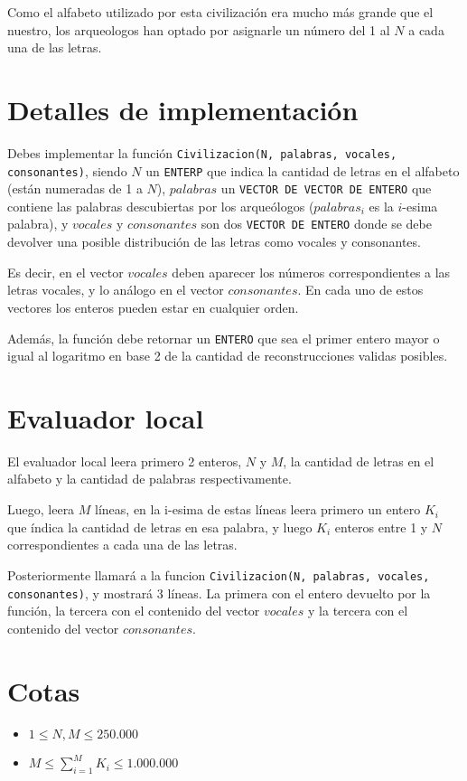 \documentclass[fontsize=13pt, paper=a4, DIV=calc]{scrartcl}
\begin{document}
\begin{multicols*}{2}
Como el alfabeto utilizado por esta civilización era mucho más grande que el nuestro, los arqueologos han optado por asignarle un número del 1 al $N$ a cada una de las letras.

\section{Detalles de implementación}
Debes implementar la función \texttt{Civilizacion(N, palabras, vocales, consonantes)}, siendo $N$ un \texttt{ENTERP} que indica la cantidad de letras en el alfabeto (están numeradas de 1 a $N$), $palabras$ un \texttt{VECTOR DE VECTOR DE ENTERO} que contiene las palabras descubiertas por los arqueólogos ($palabras_i$ es la $i$-esima palabra), y $vocales$ y $consonantes$ son dos \texttt{VECTOR DE ENTERO} donde se debe devolver una posible distribución de las letras como vocales y consonantes.

Es decir, en el vector $vocales$ deben aparecer los números correspondientes a las letras vocales, y lo análogo en el vector $consonantes$. En cada uno de estos vectores los enteros pueden estar en cualquier orden. 

Además, la función debe retornar un \texttt{ENTERO} que sea el primer entero mayor o igual al logaritmo en base 2 de la cantidad de reconstrucciones validas posibles.


\section{Evaluador local}
El evaluador local leera primero 2 enteros, $N$ y $M$, la cantidad de letras en el alfabeto y la cantidad de palabras respectivamente.

Luego, leera $M$ líneas, en la i-esima de estas líneas leera primero un entero $K_i$ que índica la cantidad de letras en esa palabra, y luego $K_i$ enteros entre 1 y $N$ correspondientes a cada una de las letras.

Posteriormente llamará a la funcion \texttt{Civilizacion(N, palabras, vocales, consonantes)}, y mostrará 3 líneas.
La primera con el entero devuelto por la función, la tercera con el contenido del vector $vocales$ y la tercera con el contenido del vector $consonantes$.

\section{Cotas}
  \begin{itemize}
     \item $ 1 \leq N,M \leq 250.000$
     \item $ M \leq \sum_{i=1}^M{K_i} \leq 1.000.000$
  \end{itemize}


\end{multicols*}
\end{document}
